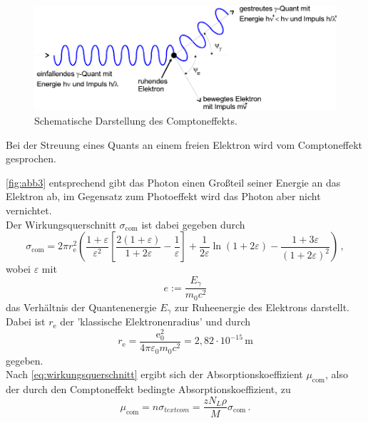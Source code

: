 \begin{figure}[H]
    \centering
    \includegraphics{figures/abb3.pdf}
    \caption{Schematische Darstellung des Comptoneffekts\cite{ap04}.}
    \label{fig:abb3}
\end{figure}

Bei der Streuung eines Quants an einem freien Elektron wird vom
Comptoneffekt gesprochen.


\autoref{fig:abb3} entsprechend gibt das Photon einen Großteil
seiner Energie an das Elektron ab, im Gegensatz zum Photoeffekt
wird das Photon aber nicht vernichtet. \\

Der Wirkungsquerschnitt $\sigma_{\mathrm{com}}$ ist dabei gegeben durch
\begin{equation}
    \sigma_{\mathrm{com}} = 2 \pi r^2_\mathrm{e} 
    \left(\frac{1 + \varepsilon}{\varepsilon^2} 
    \left[\frac{2(1 + \varepsilon)}{1 + 2 \varepsilon} -\frac{1}{\varepsilon}\right]
    + \frac{1}{2 \varepsilon} \ln(1 + 2 \varepsilon) 
    - \frac{1 + 3 \varepsilon}{(1 + 2 \varepsilon)^2}\right) \,,
    \label{eq:wirkungsquercompton}
\end{equation}
wobei $\varepsilon$ mit
\begin{equation*}
    e := \frac{E_\gamma}{m_0 c^2}
\end{equation*}
das Verhältnis der Quantenenergie $E_\gamma$ zur Ruheenergie 
des Elektrons darstellt.
Dabei ist $r_\text{e}$ der 'klassische Elektronenradius' und durch
\begin{equation*}
    r_\text{e} = \frac{\text{e}_0^2}
    {4 \pi \varepsilon_0 m_0 c^2} = 2,82 \cdot 10^{-15} \,\unit{\meter}
\end{equation*}
gegeben. \\

Nach \eqref{eq:wirkungsquerschnitt} ergibt sich der Absorptionskoeffizient
$\mu_{\text{com}}$, also der durch den Comptoneffekt bedingte
Absorptionskoeffizient, zu
\begin{equation*}
    \mu_{\text{com}} = n \sigma_{text{com}} =  
    \frac{z N_L \rho}{M} \sigma_{\text{com}} \,.
\end{equation*} 

